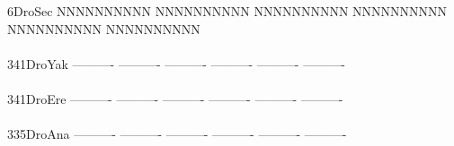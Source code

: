 \documentclass[11pt,twoside,reqno,a4paper]{article}
\begin{document}
{6\hspace*{3\charwidth}DroSec	NNNNNNNNNN	NNNNNNNNNN	NNNNNNNNNN	NNNNNNNNNN	NNNNNNNNNN	NNNNNNNNNN	\\
\hspace*{4\charwidth}\hspace*{7\charwidth}\hspace*{1\charwidth}\hspace*{1\charwidth}\hspace*{1\charwidth}\hspace*{1\charwidth}\hspace*{1\charwidth}\hspace*{1\charwidth}\\
341\hspace*{1\charwidth}DroYak	----------	----------	----------	----------	----------	----------	\\
\hspace*{4\charwidth}\hspace*{7\charwidth}\hspace*{1\charwidth}\hspace*{1\charwidth}\hspace*{1\charwidth}\hspace*{1\charwidth}\hspace*{1\charwidth}\hspace*{1\charwidth}\\
341\hspace*{1\charwidth}DroEre	----------	----------	----------	----------	----------	----------	\\
\hspace*{4\charwidth}\hspace*{7\charwidth}\hspace*{1\charwidth}\hspace*{1\charwidth}\hspace*{1\charwidth}\hspace*{1\charwidth}\hspace*{1\charwidth}\hspace*{1\charwidth}\\
335\hspace*{1\charwidth}DroAna	----------	----------	----------	----------	----------	----------	\\
\hspace*{4\charwidth}\hspace*{7\charwidth}\hspace*{1\charwidth}\hspace*{1\charwidth}\hspace*{1\charwidth}\hspace*{1\charwidth}\hspace*{1\charwidth}\hspace*{1\charwidth}\\
}
\end{document}
